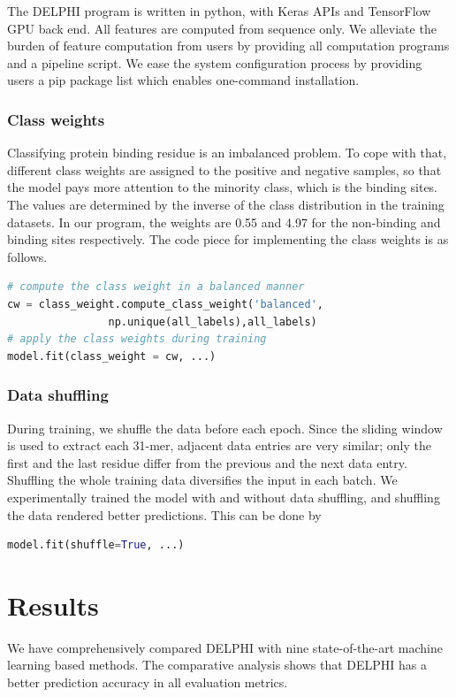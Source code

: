 The DELPHI program is written in python, with Keras \cite{chollet2015keras} APIs and TensorFlow GPU back end. All features are computed from sequence only. We alleviate the burden of feature computation from users by providing all computation programs and a pipeline script. We ease the system configuration process by providing users a pip package list which enables one-command installation. 

\subsubsection{Class weights}
Classifying protein binding residue is an imbalanced problem. To cope with that, different class weights \cite{ting2002instance} are assigned to the positive and negative samples, so that the model pays more attention to the minority class, which is the binding sites.  The values are determined by the inverse of the class distribution in the training datasets. In our program, the weights are 0.55 and 4.97 for the non-binding and binding sites respectively. The code piece for implementing the class weights is as follows.
\begin{lstlisting}[language=python,frame=single,basicstyle=\small]
# compute the class weight in a balanced manner
cw = class_weight.compute_class_weight('balanced',
                np.unique(all_labels),all_labels)
# apply the class weights during training
model.fit(class_weight = cw, ...)
\end{lstlisting}

\subsubsection{Data shuffling}
During training, we shuffle the data before each epoch. Since the sliding window is used to extract each 31-mer, adjacent data entries are very similar; only the first and the last residue differ from the previous and the next data entry. Shuffling the whole training data diversifies the input in each batch. We experimentally trained the model with and without data shuffling, and shuffling the data rendered better predictions. This can be done by 
\begin{lstlisting}[language=python,frame=single]
  model.fit(shuffle=True, ...)
\end{lstlisting}

\section{Results}
We have comprehensively compared DELPHI with nine state-of-the-art machine learning based methods. The comparative analysis shows that DELPHI has a better prediction accuracy in all evaluation metrics. 

